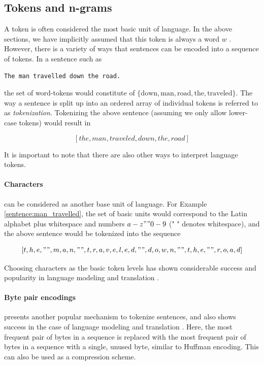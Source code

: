 \documentclass[a4paper,12pt,twoside,openright]{report}
\begin{document}
\subsection{Tokens and n-grams}

A token is often considered the most basic unit of language.
In the above sections, we have implicitly assumed that this token is always a word $w$ . 
However, there is a variety of ways that sentences can be encoded into a sequence of tokens.
In a sentence such as

\begin{verbatim}
The man travelled down the road.
\end{verbatim}\label{sentence:man_travelled}

the set of word-tokens would constitute of $\{ \text{down}, \text{man}, \text{road}, \text{the}, \text{traveled} \}$.
The way a sentence is split up into an ordered array of individual tokens is referred to as \textit{tokenization}.
Tokenizing the above sentence (assuming we only allow lower-case tokens) would result in 

$$
[the, man, traveled, down, the, road]
$$

It is important to note that there are also other ways to interpret language tokens.

\paragraph{Characters} can be considered as another base unit of language.
For Example \ref{sentence:man_travelled}, the set of basic units would correspond to the Latin alphabet plus whitespace and numbers $a - z" "0-9$ (" " denotes whitespace), and the above sentence would be tokenized into the sequence 

$$
[t, h, e, " ", m, a, n, " ", t, r, a, v, e, l, e, d, " ", d, o, w, n, " ", t, h, e, " ", r, o, a, d]
$$

Choosing characters as the basic token levels has shown considerable success and popularity in language modeling \cite{sutskever11} and translation \cite{lee17}.

\paragraph{Byte pair encodings} \cite{gage94} presents another popular mechanism to tokenize sentences, and also shows success in the case of language modeling and translation \cite{sennrich16}. 
Here, the most frequent pair of bytes in a sequence is replaced with the most frequent pair of bytes in a sequence with a single, unused byte, similar to Huffman encoding.
This can also be used as a compression scheme.
\end{document}
